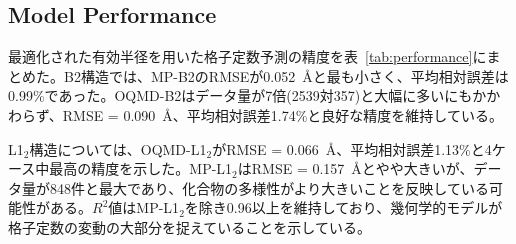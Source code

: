 \documentclass[a4paper,10pt,5p]{elsarticle}
\begin{document}
\subsection{Model Performance}

最適化された有効半径を用いた格子定数予測の精度を表~\ref{tab:performance}にまとめた。B2構造では、MP-B2のRMSEが0.052~\AA と最も小さく、平均相対誤差は0.99\%であった。OQMD-B2はデータ量が7倍(2539対357)と大幅に多いにもかかわらず、RMSE = 0.090~\AA、平均相対誤差1.74\%と良好な精度を維持している。

L1$_2$構造については、OQMD-L1$_2$がRMSE = 0.066~\AA、平均相対誤差1.13\%と4ケース中最高の精度を示した。MP-L1$_2$はRMSE = 0.157~\AA とやや大きいが、データ量が848件と最大であり、化合物の多様性がより大きいことを反映している可能性がある。$R^2$値はMP-L1$_2$を除き0.96以上を維持しており、幾何学的モデルが格子定数の変動の大部分を捉えていることを示している。



\begin{table}[htbp]
\small
    \centering
    \caption{Lattice constant prediction accuracy using optimized effective radii. RMSE is the root-mean-square error between observed and predicted lattice constants, MAE is the mean absolute error, and $R^2$ is the coefficient of determination. The mean and maximum relative errors are also shown.}
    \label{tab:performance}
\end{table}
\end{document}
